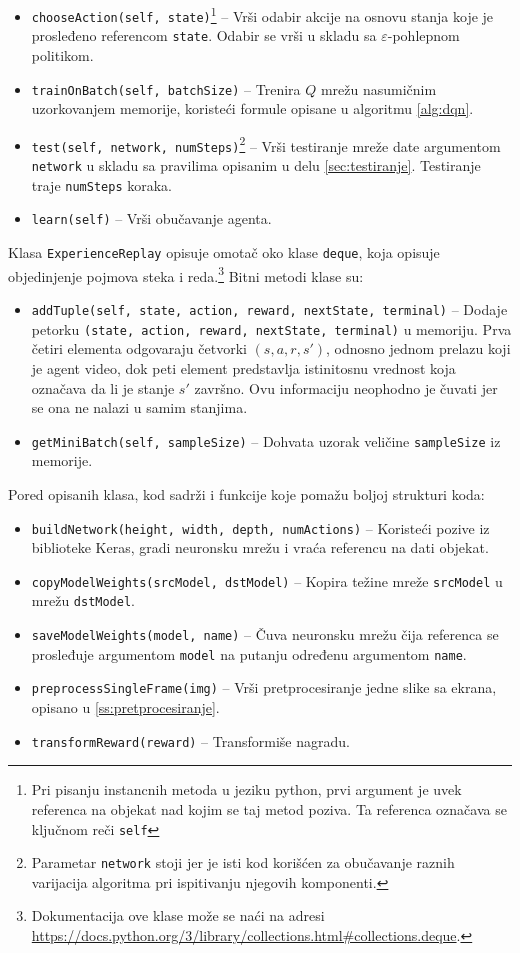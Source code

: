 \begin{itemize}
	\item \texttt{chooseAction(self, state)}\footnote{Pri pisanju instancnih metoda u jeziku python, prvi argument je uvek referenca na objekat nad kojim se taj metod poziva. Ta referenca označava se ključnom reči \texttt{self}} -- Vrši odabir akcije na osnovu stanja koje je prosleđeno referencom \texttt{state}. Odabir se vrši u skladu sa $\varepsilon$-pohlepnom politikom.
	\item \texttt{trainOnBatch(self, batchSize)} -- Trenira $Q$ mrežu nasumičnim uzorkovanjem memorije, koristeći formule opisane u algoritmu \ref{alg:dqn}.
	\item \texttt{test(self, network, numSteps)}\footnote{Parametar \texttt{network} stoji jer je isti kod korišćen za obučavanje raznih varijacija algoritma pri ispitivanju njegovih komponenti.} -- Vrši testiranje mreže date argumentom \texttt{network} u skladu sa pravilima opisanim u delu \ref{sec:testiranje}. Testiranje traje \texttt{numSteps} koraka.
	\item \texttt{learn(self)} -- Vrši obučavanje agenta. 
\end{itemize}
\par 
Klasa \texttt{ExperienceReplay} opisuje omotač oko klase \texttt{deque}, koja opisuje objedinjenje pojmova steka i reda.\footnote{Dokumentacija ove klase može se naći na adresi \url{https://docs.python.org/3/library/collections.html\#collections.deque}.} Bitni metodi klase su:
\begin{itemize}
	\item \texttt{addTuple(self, state, action, reward, nextState, terminal)} -- Dodaje petorku \texttt{(state, action, reward, nextState, terminal)} u memoriju. Prva četiri elementa odgovaraju četvorki $(s, a, r, s')$, odnosno jednom prelazu koji je agent video, dok peti element predstavlja istinitosnu vrednost koja označava da li je stanje $s'$ završno. Ovu informaciju neophodno je čuvati jer se ona ne nalazi u samim stanjima.
	\item \texttt{getMiniBatch(self, sampleSize)} -- Dohvata uzorak veličine \texttt{sampleSize} iz memorije.
\end{itemize}
\par 
Pored opisanih klasa, kod sadrži i funkcije koje pomažu boljoj strukturi koda:
\begin{itemize}
	\item \texttt{buildNetwork(height, width, depth, numActions)} -- Koristeći pozive iz biblioteke Keras, gradi neuronsku mrežu i vraća referencu na dati objekat.
	\item \texttt{copyModelWeights(srcModel, dstModel)} -- Kopira težine mreže \texttt{srcModel} u mrežu \texttt{dstModel}.
	\item \texttt{saveModelWeights(model, name)} -- Čuva neuronsku mrežu čija referenca se prosleđuje argumentom \texttt{model} na putanju određenu argumentom \texttt{name}.
	\item \texttt{preprocessSingleFrame(img)} -- Vrši pretprocesiranje jedne slike sa ekrana, opisano u \ref{ss:pretprocesiranje}.
	\item \texttt{transformReward(reward)} -- Transformiše nagradu.
\end{itemize}

